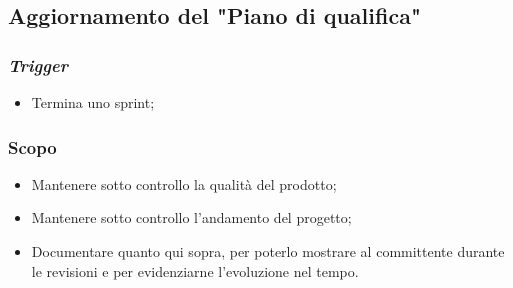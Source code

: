 \subsection{Aggiornamento del "Piano di qualifica"}
\label{aggiornare-pdq}

\subsubsection{\textit{Trigger}}
\begin{itemize}
	\item Termina uno sprint;
\end{itemize}

\subsubsection{Scopo}
\begin{itemize}
	\item Mantenere sotto controllo la qualità del prodotto;

	\item Mantenere sotto controllo l'andamento del progetto;

	\item Documentare quanto qui sopra, per poterlo mostrare al committente
	      durante le revisioni e per evidenziarne l'evoluzione nel tempo.
\end{itemize}

